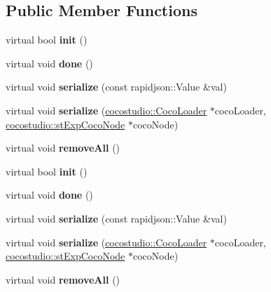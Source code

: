 \subsection*{Public Member Functions}
\begin{DoxyCompactItemize}
\item 
\mbox{\label{classcocostudio_1_1BaseTriggerAction_aed1674a5631333c1fa26038587e8252f}} 
virtual bool {\bfseries init} ()
\item 
\mbox{\label{classcocostudio_1_1BaseTriggerAction_af2ba5c0ce7ecc8d23207ef356dc49859}} 
virtual void {\bfseries done} ()
\item 
\mbox{\label{classcocostudio_1_1BaseTriggerAction_a10ddab638f695ebc50a03814804b572d}} 
virtual void {\bfseries serialize} (const rapidjson\+::\+Value \&val)
\item 
\mbox{\label{classcocostudio_1_1BaseTriggerAction_a18a55197e7b7bb30be8c3299155270f6}} 
virtual void {\bfseries serialize} (\hyperlink{classcocostudio_1_1CocoLoader}{cocostudio\+::\+Coco\+Loader} $\ast$coco\+Loader, \hyperlink{structcocostudio_1_1stExpCocoNode}{cocostudio\+::st\+Exp\+Coco\+Node} $\ast$coco\+Node)
\item 
\mbox{\label{classcocostudio_1_1BaseTriggerAction_add59d6e74dbf6a0677fb83489dbda0f1}} 
virtual void {\bfseries remove\+All} ()
\item 
\mbox{\label{classcocostudio_1_1BaseTriggerAction_a1362b8036f004a23f52f8c77dd1bf4c4}} 
virtual bool {\bfseries init} ()
\item 
\mbox{\label{classcocostudio_1_1BaseTriggerAction_aa6d3bfb024a15ec80bdda5f02d2879f0}} 
virtual void {\bfseries done} ()
\item 
\mbox{\label{classcocostudio_1_1BaseTriggerAction_a1b0be90ce7cc1726d58223f775bfc431}} 
virtual void {\bfseries serialize} (const rapidjson\+::\+Value \&val)
\item 
\mbox{\label{classcocostudio_1_1BaseTriggerAction_a43a0daa988a78c0c372efe4cfeba3be9}} 
virtual void {\bfseries serialize} (\hyperlink{classcocostudio_1_1CocoLoader}{cocostudio\+::\+Coco\+Loader} $\ast$coco\+Loader, \hyperlink{structcocostudio_1_1stExpCocoNode}{cocostudio\+::st\+Exp\+Coco\+Node} $\ast$coco\+Node)
\item 
\mbox{\label{classcocostudio_1_1BaseTriggerAction_ad451080dca6d71349c57b03613f8ea90}} 
virtual void {\bfseries remove\+All} ()
\end{DoxyCompactItemize}


